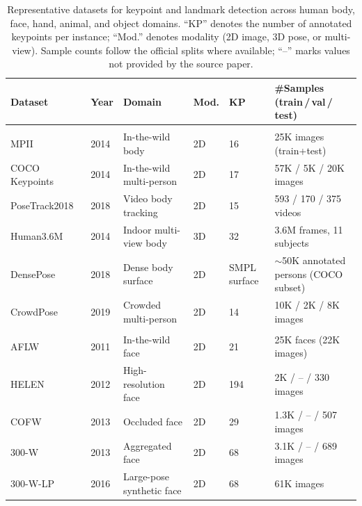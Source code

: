 \begin{table}[!t]
\centering
\caption{Representative datasets for keypoint and landmark detection across human body, face, hand, animal, and object domains. ``KP'' denotes the number of annotated keypoints per instance; ``Mod.'' denotes modality (2D image, 3D pose, or multi-view). Sample counts follow the official splits where available; ``--'' marks values not provided by the source paper.}
\label{tab:keypoint_dataset_summary}
\fontsize{9}{11}\selectfont
\setlength{\tabcolsep}{1.0mm}
\begin{tabular}{L{0.22\textwidth} C{0.06\textwidth} L{0.23\textwidth} C{0.11\textwidth} C{0.08\textwidth} L{0.23\textwidth}}
\toprule
\textbf{Dataset} & \textbf{Year} & \textbf{Domain} & \textbf{Mod.} & \textbf{KP} & \textbf{\#Samples (train\,/\,val\,/\,test)} \\
\midrule
{}  \\
MPII~\cite{andriluka20142d}            & 2014 & In-the-wild body & 2D & 16 & 25K images (train+test) \\
COCO Keypoints~\cite{lin2014microsoft} & 2014 & In-the-wild multi-person & 2D & 17 & 57K / 5K / 20K images \\
PoseTrack2018~\cite{andriluka2018posetrack} & 2018 & Video body tracking & 2D & 15 & 593 / 170 / 375 videos \\
Human3.6M~\cite{IonescuPOS14}   & 2014 & Indoor multi-view body & 3D & 32 & 3.6M frames, 11 subjects \\
DensePose~\cite{guler2018densepose}    & 2018 & Dense body surface & 2D & SMPL surface & $\sim$50K annotated persons (COCO subset) \\
CrowdPose~\cite{li2019crowdpose}       & 2019 & Crowded multi-person & 2D & 14 & 10K / 2K / 8K images \\
\midrule
{}  \\
AFLW~\cite{koestinger2011annotated}    & 2011 & In-the-wild face & 2D & 21 & 25K faces (22K images) \\
HELEN~\cite{le2012interactive}         & 2012 & High-resolution face & 2D & 194 & 2K / -- / 330 images \\
COFW~\cite{burgos2013robust}           & 2013 & Occluded face & 2D & 29 & 1.3K / -- / 507 images \\
300-W~\cite{sagonas2013300}            & 2013 & Aggregated face & 2D & 68 & 3.1K / -- / 689 images \\
300-W-LP~\cite{zhu2016face}            & 2016 & Large-pose synthetic face & 2D & 68 & 61K images \\

\end{tabular}
\end{table}
